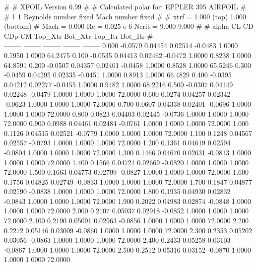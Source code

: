 #  
#       XFOIL         Version 6.99
#  
# Calculated polar for: EPPLER 395 AIRFOIL                              
#  
# 1 1 Reynolds number fixed          Mach number fixed         
#  
# xtrf =   1.000 (top)        1.000 (bottom)  
# Mach =   0.000     Re =     0.025 e 6     Ncrit =   9.000  9.000
#  
#   alpha    CL        CD       CDp       CM     Top_Xtr  Bot_Xtr  Top_Itr  Bot_Itr
#  ------ -------- --------- --------- -------- -------- -------- -------- --------
   0.000  -0.0579   0.04454   0.02514  -0.0483   1.0000   0.7950   1.0000  64.2475
   0.100  -0.0535   0.04413   0.02462  -0.0472   1.0000   0.8238   1.0000  64.8591
   0.200  -0.0507   0.04357   0.02401  -0.0458   1.0000   0.8528   1.0000  65.5246
   0.300  -0.0459   0.04295   0.02335  -0.0451   1.0000   0.8913   1.0000  66.4829
   0.400  -0.0395   0.04212   0.02277  -0.0455   1.0000   0.9482   1.0000  68.2216
   0.500  -0.0307   0.04149   0.02248  -0.0479   1.0000   1.0000   1.0000  72.0000
   0.600   0.0274   0.04257   0.02342  -0.0623   1.0000   1.0000   1.0000  72.0000
   0.700   0.0607   0.04338   0.02401  -0.0696   1.0000   1.0000   1.0000  72.0000
   0.800   0.0823   0.04403   0.02445  -0.0736   1.0000   1.0000   1.0000  72.0000
   0.900   0.0988   0.04461   0.02484  -0.0761   1.0000   1.0000   1.0000  72.0000
   1.000   0.1126   0.04515   0.02521  -0.0779   1.0000   1.0000   1.0000  72.0000
   1.100   0.1248   0.04567   0.02557  -0.0793   1.0000   1.0000   1.0000  72.0000
   1.200   0.1361   0.04619   0.02594  -0.0804   1.0000   1.0000   1.0000  72.0000
   1.300   0.1466   0.04670   0.02631  -0.0813   1.0000   1.0000   1.0000  72.0000
   1.400   0.1566   0.04721   0.02669  -0.0820   1.0000   1.0000   1.0000  72.0000
   1.500   0.1663   0.04773   0.02709  -0.0827   1.0000   1.0000   1.0000  72.0000
   1.600   0.1756   0.04825   0.02749  -0.0833   1.0000   1.0000   1.0000  72.0000
   1.700   0.1847   0.04877   0.02790  -0.0838   1.0000   1.0000   1.0000  72.0000
   1.800   0.1935   0.04930   0.02832  -0.0843   1.0000   1.0000   1.0000  72.0000
   1.900   0.2022   0.04983   0.02874  -0.0848   1.0000   1.0000   1.0000  72.0000
   2.000   0.2107   0.05037   0.02918  -0.0852   1.0000   1.0000   1.0000  72.0000
   2.100   0.2190   0.05091   0.02963  -0.0856   1.0000   1.0000   1.0000  72.0000
   2.200   0.2272   0.05146   0.03009  -0.0860   1.0000   1.0000   1.0000  72.0000
   2.300   0.2353   0.05202   0.03056  -0.0863   1.0000   1.0000   1.0000  72.0000
   2.400   0.2433   0.05258   0.03103  -0.0867   1.0000   1.0000   1.0000  72.0000
   2.500   0.2512   0.05316   0.03152  -0.0870   1.0000   1.0000   1.0000  72.0000
